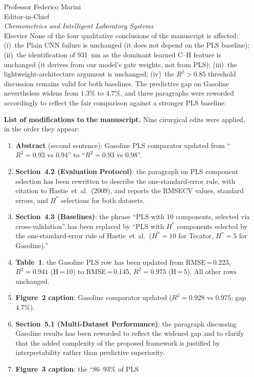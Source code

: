 \documentclass[11pt,a4paper]{letter}
\begin{document}
\begin{letter}{Professor Federico Marini \\
               Editor-in-Chief \\
               \textit{Chemometrics and Intelligent Laboratory Systems} \\
               Elsevier}
None of the four qualitative conclusions of the manuscript is affected:
(i)~the Plain CNN failure is unchanged (it does not depend on the PLS
baseline); (ii)~the identification of 931~nm as the dominant learned
C--H feature is unchanged (it derives from our model's gate weights, not
from PLS); (iii)~the lightweight-architecture argument is unchanged;
(iv)~the $R^2>0.85$ threshold discussion remains valid for both
baselines. The predictive gap on Gasoline nevertheless widens from
$1.3\%$ to $4.7\%$, and three paragraphs were reworded accordingly to
reflect the fair comparison against a stronger PLS baseline.

\medskip
\textbf{List of modifications to the manuscript.}
Nine cirurgical edits were applied, in the order they appear:

\begin{enumerate}
  \setlength\itemsep{0.1em}
  \item \textbf{Abstract} (second sentence): Gasoline PLS comparator
        updated from ``$R^2=0.93$ vs $0.94$'' to
        ``$R^2=0.93$ vs $0.98$''.
  \item \textbf{Section~4.2 (Evaluation Protocol)}: the paragraph on
        PLS component selection has been rewritten to describe the
        one-standard-error rule, with citation to
        Hastie~et~al.~(2009), and reports the RMSECV values, standard
        errors, and $H^*$ selections for both datasets.
  \item \textbf{Section~4.3 (Baselines)}: the phrase ``PLS with 10
        components, selected via cross-validation'' has been replaced by
        ``PLS with $H^*$ components selected by the one-standard-error
        rule of Hastie~et~al.\ ($H^*=10$ for Tecator, $H^*=5$ for
        Gasoline).''
  \item \textbf{Table~1}: the Gasoline PLS row has been updated from
        RMSE\,=\,0.223, $R^2=0.941$ (H\,=\,10) to
        RMSE\,=\,0.145, $R^2=0.975$ (H\,=\,5). All other rows unchanged.
  \item \textbf{Figure~2 caption}: Gasoline comparator updated
        ($R^2=0.928$ vs $0.975$; gap $4.7\%$).
  \item \textbf{Section~5.1 (Multi-Dataset Performance)}: the paragraph
        discussing Gasoline results has been reworded to reflect the
        widened gap and to clarify that the added complexity of the
        proposed framework is justified by interpretability rather than
        predictive superiority.
  \item \textbf{Figure~3 caption}: the ``$86$--$93\%$ of PLS

\end{enumerate}
\end{letter}
\end{document}
